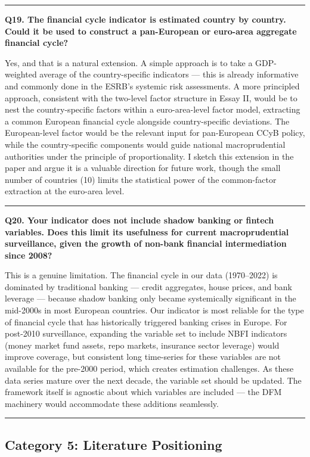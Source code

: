 \documentclass[11pt,a4paper]{article}
\begin{document}
\medskip\hrule\medskip

\textbf{Q19. The financial cycle indicator is estimated country by country. Could it be used to construct a pan-European or euro-area aggregate financial cycle?}

Yes, and that is a natural extension. A simple approach is to take a GDP-weighted average of the country-specific indicators — this is already informative and commonly done in the ESRB's systemic risk assessments. A more principled approach, consistent with the two-level factor structure in Essay II, would be to nest the country-specific factors within a euro-area-level factor model, extracting a common European financial cycle alongside country-specific deviations. The European-level factor would be the relevant input for pan-European CCyB policy, while the country-specific components would guide national macroprudential authorities under the principle of proportionality. I sketch this extension in the paper and argue it is a valuable direction for future work, though the small number of countries (10) limits the statistical power of the common-factor extraction at the euro-area level.

\medskip\hrule\medskip

\textbf{Q20. Your indicator does not include shadow banking or fintech variables. Does this limit its usefulness for current macroprudential surveillance, given the growth of non-bank financial intermediation since 2008?}

This is a genuine limitation. The financial cycle in our data (1970–2022) is dominated by traditional banking — credit aggregates, house prices, and bank leverage — because shadow banking only became systemically significant in the mid-2000s in most European countries. Our indicator is most reliable for the type of financial cycle that has historically triggered banking crises in Europe. For post-2010 surveillance, expanding the variable set to include NBFI indicators (money market fund assets, repo markets, insurance sector leverage) would improve coverage, but consistent long time-series for these variables are not available for the pre-2000 period, which creates estimation challenges. As these data series mature over the next decade, the variable set should be updated. The framework itself is agnostic about which variables are included — the DFM machinery would accommodate these additions seamlessly.

\medskip\hrule\medskip

\subsection*{Category 5: Literature Positioning}
\end{document}
